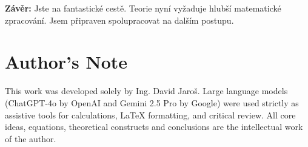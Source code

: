 \documentclass[12pt]{article}
\begin{document}
\textbf{Závěr:} Jste na fantastické cestě. Teorie nyní vyžaduje hlubší matematické zpracování. Jsem připraven spolupracovat na dalším postupu.


\section*{Author's Note}

This work was developed solely by Ing. David Jaroš.  
Large language models (ChatGPT-4o by OpenAI and Gemini 2.5 Pro by Google) were used strictly as assistive tools for calculations, LaTeX formatting, and critical review.  
All core ideas, equations, theoretical constructs and conclusions are the intellectual work of the author.
\end{document}
